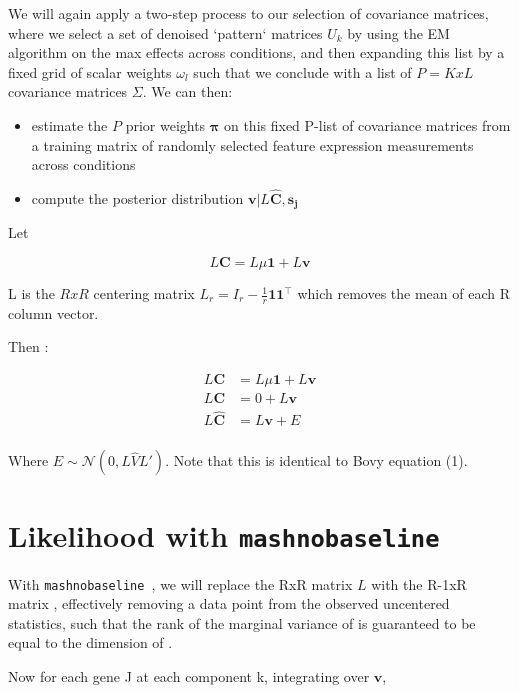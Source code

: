 \documentclass[11pt, oneside]{article}   	%
\newcommand{\Norm}{{\mathcal{N}}} %
\newcommand{\ceff}{\bm{C}}
\newcommand{\wfit}{\bm{w}}
\newcommand{\chat}{\bm{\hat{C}}}
\newcommand{\vb}{\bm{v}}
\def\lstar{\text{ L}}
\def\mnb{{\tt mashnobaseline }}
\begin{document}
We will again apply a two-step process to our selection of covariance matrices, where we select a set of denoised `pattern` matrices $U_{k}$ by using the EM algorithm on the max effects across conditions,
and then expanding this list by a fixed grid of scalar weights $\omega_{l}$ such that we conclude with a list of $P=KxL$ covariance matrices $\Sigma$. We can then:
\begin{itemize}
\item estimate the $P$ prior weights $\bm\pi$ on this fixed P-list of covariance matrices from a training matrix of randomly selected feature expression measurements across conditions
\item compute the posterior distribution $\vb | L \chat, \bm{s_{j}}$
\end{itemize}
Let 

\begin{equation}
L \ceff = L \mu \bm{1} + L \vb
\end{equation}

L is the $RxR$ centering matrix $L_{r}=I_{r}-{\tfrac  {1}{r}}{\mathbf  {1}}{\mathbf  {1}}^{\top }$ which removes the mean of each R column vector.

Then :

\begin{equation}
\label{model}
\begin{aligned}
L \ceff &= L \mu \bm{1}+ L \vb \\
L \ceff &= 0 + L \vb \\
L \chat &= L \vb + E \\
\end{aligned}
\end{equation}



Where $E \sim \Norm (0, L\hat{V} L')$. Note that this is identical to Bovy equation (1). 





\section{Likelihood with \mnb{}}

With \mnb{}, we will replace the RxR matrix $L$ with the R-1xR matrix \lstar, effectively removing a data point from the observed uncentered statistics, such that the rank of the marginal variance of \wfit is guaranteed to be equal to the dimension of \wfit.

Now for each gene J at each component k, integrating over $\vb$, 
\end{document}
